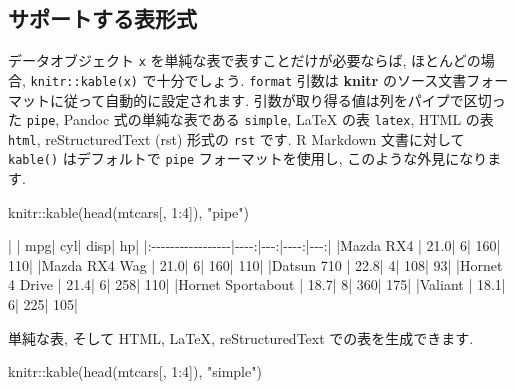 \documentclass[
  11pt,
  lualatex,
  ja=standard]{bxjsreport}
\newenvironment{Shaded}{\begin{snugshade}}{\end{snugshade}}
\newcommand{\DecValTok}[1]{\textcolor[rgb]{0.00,0.00,0.81}{#1}}
\newcommand{\FunctionTok}[1]{\textcolor[rgb]{0.00,0.00,0.00}{#1}}
\newcommand{\NormalTok}[1]{#1}
\newcommand{\SpecialCharTok}[1]{\textcolor[rgb]{0.00,0.00,0.00}{#1}}
\newcommand{\StringTok}[1]{\textcolor[rgb]{0.31,0.60,0.02}{#1}}
\begin{document}
\hypertarget{kable-formats}{%
\subsection{サポートする表形式}\label{kable-formats}}

データオブジェクト \texttt{x} を単純な表で表すことだけが必要ならば, ほとんどの場合, \texttt{knitr::kable(x)} で十分でしょう. \texttt{format} 引数は \textbf{knitr} のソース文書フォーマットに従って自動的に設定されます. 引数が取り得る値は列をパイプで区切った \texttt{pipe}, Pandoc 式の単純な表である \texttt{simple}, LaTeX の表 \texttt{latex}, HTML の表 \texttt{html}, reStructuredText (rst) 形式の \texttt{rst} です. R Markdown 文書に対して \texttt{kable()} はデフォルトで \texttt{pipe} フォーマットを使用し, このような外見になります.

\begin{Shaded}
\begin{Highlighting}[numbers=left,,]
\NormalTok{knitr}\SpecialCharTok{::}\FunctionTok{kable}\NormalTok{(}\FunctionTok{head}\NormalTok{(mtcars[, }\DecValTok{1}\SpecialCharTok{:}\DecValTok{4}\NormalTok{]), }\StringTok{"pipe"}\NormalTok{)}
\end{Highlighting}
\end{Shaded}

\begin{Shaded}
\begin{Highlighting}[]
\NormalTok{|                  |  mpg| cyl| disp|  hp|}
\NormalTok{|:{-}{-}{-}{-}{-}{-}{-}{-}{-}{-}{-}{-}{-}{-}{-}{-}{-}|{-}{-}{-}{-}:|{-}{-}{-}:|{-}{-}{-}{-}:|{-}{-}{-}:|}
\NormalTok{|Mazda RX4         | 21.0|   6|  160| 110|}
\NormalTok{|Mazda RX4 Wag     | 21.0|   6|  160| 110|}
\NormalTok{|Datsun 710        | 22.8|   4|  108|  93|}
\NormalTok{|Hornet 4 Drive    | 21.4|   6|  258| 110|}
\NormalTok{|Hornet Sportabout | 18.7|   8|  360| 175|}
\NormalTok{|Valiant           | 18.1|   6|  225| 105|}
\end{Highlighting}
\end{Shaded}

単純な表, そして HTML, LaTeX, reStructuredText での表を生成できます.

\begin{Shaded}
\begin{Highlighting}[numbers=left,,]
\NormalTok{knitr}\SpecialCharTok{::}\FunctionTok{kable}\NormalTok{(}\FunctionTok{head}\NormalTok{(mtcars[, }\DecValTok{1}\SpecialCharTok{:}\DecValTok{4}\NormalTok{]), }\StringTok{"simple"}\NormalTok{)}
\end{Highlighting}
\end{Shaded}
\end{document}
